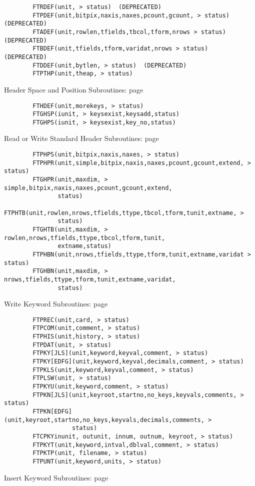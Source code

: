 \documentclass[11pt]{book}
\begin{document}
\begin{verbatim}
        FTRDEF(unit, > status)  (DEPRECATED)
        FTPDEF(unit,bitpix,naxis,naxes,pcount,gcount, > status)  (DEPRECATED)
        FTADEF(unit,rowlen,tfields,tbcol,tform,nrows > status)  (DEPRECATED)
        FTBDEF(unit,tfields,tform,varidat,nrows > status)  (DEPRECATED)
        FTDDEF(unit,bytlen, > status)  (DEPRECATED)
        FTPTHP(unit,theap, > status)
\end{verbatim}
 Header Space and Position Subroutines: page~\pageref{FTHDEF}

\begin{verbatim}
        FTHDEF(unit,morekeys, > status)
        FTGHSP(iunit, > keysexist,keysadd,status)
        FTGHPS(iunit, > keysexist,key_no,status)
\end{verbatim}
 Read or Write Standard Header Subroutines: page~\pageref{FTPHPR}

\begin{verbatim}
        FTPHPS(unit,bitpix,naxis,naxes, > status)
        FTPHPR(unit,simple,bitpix,naxis,naxes,pcount,gcount,extend, > status)
        FTGHPR(unit,maxdim, > simple,bitpix,naxis,naxes,pcount,gcount,extend,
               status)
        FTPHTB(unit,rowlen,nrows,tfields,ttype,tbcol,tform,tunit,extname, >
               status)
        FTGHTB(unit,maxdim, > rowlen,nrows,tfields,ttype,tbcol,tform,tunit,
               extname,status)
        FTPHBN(unit,nrows,tfields,ttype,tform,tunit,extname,varidat > status)
        FTGHBN(unit,maxdim, > nrows,tfields,ttype,tform,tunit,extname,varidat,
               status)
\end{verbatim}
 Write Keyword Subroutines: page~\pageref{FTPREC}

\begin{verbatim}
        FTPREC(unit,card, > status)
        FTPCOM(unit,comment, > status)
        FTPHIS(unit,history, > status)
        FTPDAT(unit, > status)
        FTPKY[JLS](unit,keyword,keyval,comment, > status)
        FTPKY[EDFG](unit,keyword,keyval,decimals,comment, > status)
        FTPKLS(unit,keyword,keyval,comment, > status)
        FTPLSW(unit, > status)
        FTPKYU(unit,keyword,comment, > status)
        FTPKN[JLS](unit,keyroot,startno,no_keys,keyvals,comments, > status)
        FTPKN[EDFG](unit,keyroot,startno,no_keys,keyvals,decimals,comments, >
                   status)
        FTCPKYinunit, outunit, innum, outnum, keyroot, > status)
        FTPKYT(unit,keyword,intval,dblval,comment, > status)
        FTPKTP(unit, filename, > status)
        FTPUNT(unit,keyword,units, > status)
\end{verbatim}
 Insert Keyword Subroutines: page~\pageref{FTIREC}
\end{document}
